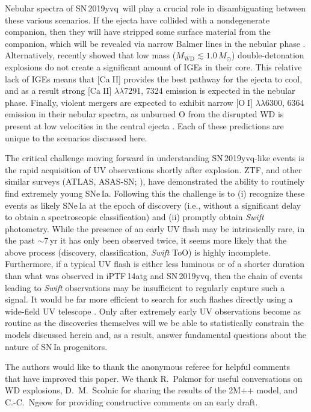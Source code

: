 \documentclass[twocolumn]{aastex63}
\def\ion#1#2{#1$\;${\footnotesize\rm{#2}}\relax}
\newcommand{\sn}{SN\,2019yvq}
\begin{document}
Nebular spectra of \sn\ will play a crucial role in disambiguating between
these various scenarios. If the ejecta have collided with a nondegenerate
companion, then they will have stripped some surface material from the
companion, which will be revealed via narrow Balmer lines in the nebular phase
\citep[e.g.,][]{Wheeler75}. Alternatively, \citet{Polin19a} recently showed
that low mass ($M_\mathrm{WD} \lesssim 1.0\,M_\odot$) double-detonation
explosions do not create a significant amount of IGEs in their core. This
relative lack of IGEs means that [\ion{Ca}{II}] provides the best pathway for
the ejecta to cool, and as a result strong [\ion{Ca}{II}]
$\lambda\lambda$7291, 7324 emission is expected in the nebular phase. Finally,
violent mergers are expected to exhibit narrow [\ion{O}{I}]
$\lambda\lambda$6300, 6364 emission in their nebular spectra, as unburned O
from the disrupted WD is present at low velocities in the central ejecta
\citep{Taubenberger13,Kromer16}. Each of these predictions are unique to the
scenarios discussed here.

The critical challenge moving forward in understanding \sn-like events is the
rapid acquisition of UV observations shortly after explosion. ZTF, and other
similar surveys (ATLAS, ASAS-SN; \citealt{Tonry11,Holoien17}), have
demonstrated the ability to routinely find extremely young SNe\,Ia. Following
this the challenge is to (i) recognize these events as likely SNe\,Ia at the
epoch of discovery (i.e., without a significant delay to obtain a
spectroscopic classification) and (ii) promptly obtain \textit{Swift}
photometry. While the presence of an early UV flash may be intrinsically rare,
in the past $\sim$7\,yr it has only been observed twice, it seems more likely
that the above process (discovery, classification, \textit{Swift} ToO) is
highly incomplete. Furthermore, if a typical UV flash is either less luminous
or of a shorter duration than what was observed in iPTF\,14atg and \sn, then
the chain of events leading to \textit{Swift} observations may be insufficient
to regularly capture such a signal. It would be far more efficient to search
for such flashes directly using a wide-field UV telescope
\citep[e.g.,][]{Sagiv14}. Only after extremely early UV observations become as
routine as the discoveries themselves will we be able to statistically
constrain the models discussed herein and, as a result, answer fundamental
questions about the nature of SN\,Ia progenitors.


\acknowledgements

The authors would like to thank the anonymous referee for helpful comments
that have improved this paper. We thank R.~Pakmor for useful conversations on
WD explosions, D.~M.~Scolnic for sharing the results of the 2M++ model, and
C.-C.~Ngeow for providing constructive comments on an early draft.
\end{document}

